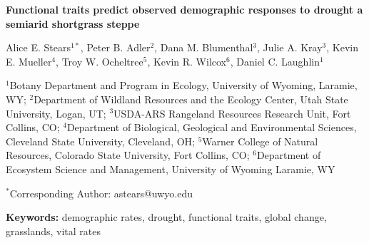 \documentclass[12pt, letterpaper]{article}
\begin{document}
\begin{flushleft}
\Large{\textbf{Functional traits predict observed demographic responses to drought a semiarid shortgrass steppe}} 

\normalsize{Alice E. Stears$^{1*}$, Peter B. Adler$^2$, Dana M. Blumenthal$^3$, Julie A. Kray$^3$, Kevin E. Mueller$^4$, Troy W. Ocheltree$^5$, Kevin R. Wilcox$^6$, Daniel C. Laughlin$^1$}

\small{$^1$Botany Department and Program in Ecology, University of Wyoming, Laramie, WY; \linebreak
$^2$Department of Wildland Resources and the Ecology Center, Utah State University, Logan, UT; \linebreak
$^3$USDA-ARS Rangeland Resources Research Unit, Fort Collins, CO; \linebreak
$^4$Department of Biological, Geological and Environmental Sciences, Cleveland State University, Cleveland, OH; \linebreak
$^5$Warner College of Natural Resources, Colorado State University, Fort Collins, CO; \linebreak
$^6$Department of Ecosystem Science and Management, University of Wyoming Laramie, WY}\linebreak

\small{$^*$Corresponding Author: astears@uwyo.edu}

\end{flushleft}
\textbf{Keywords:} demographic rates, drought, functional traits, global change, grasslands, vital rates
\end{document}
